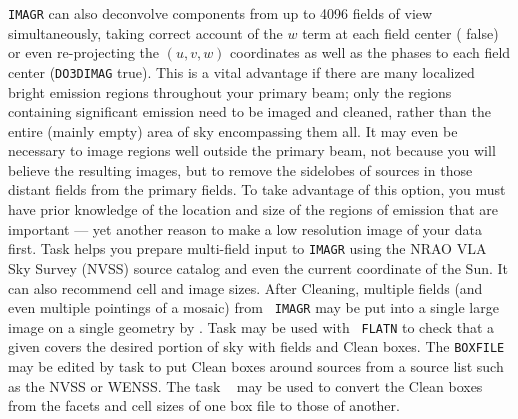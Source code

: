      {\tt IMAGR} can also deconvolve components from up to 4096 fields
of view simultaneously, taking correct account of the $w$ term at each
field center ({\tt {}} false) or even re-projecting the
$(u, v, w)$ coordinates as well as the phases to each field center
({\tt DO3DIMAG} true).  This is a vital advantage if there are many
localized bright emission regions throughout your primary beam; only
the regions containing significant emission need to be imaged and
cleaned, rather than the entire (mainly empty) area of sky
encompassing them all.  It may even be necessary to image regions well
outside the primary beam, not because you will believe the resulting
images, but to remove the sidelobes of sources in those distant
fields from the primary fields.  To take advantage of this option,
you must have prior knowledge of the location and size of the regions
of emission that are important --- yet another reason to make a low
resolution image of your data first.  Task {\tt {}} helps
you prepare multi-field input to {\tt IMAGR} using the NRAO VLA Sky
Survey (NVSS) source catalog and even the current coordinate of the
Sun.  It can also recommend cell and image sizes.  After Cleaning,
multiple fields (and even multiple pointings of a mosaic) from {\tt
IMAGR} may be put into a single large image on a single geometry by
{\tt {}}\@.  Task {\tt {}} may be used with {\tt
FLATN} to check that a given {\tt {}} covers the desired
portion of sky with fields and Clean boxes.  The {\tt BOXFILE} may be
edited by task {\tt {}} to put Clean boxes around sources
from a source list such as the NVSS or WENSS\@.  The task {\tt
{}} may be used to convert the Clean boxes from the facets
and cell sizes of one box file to those of another.

